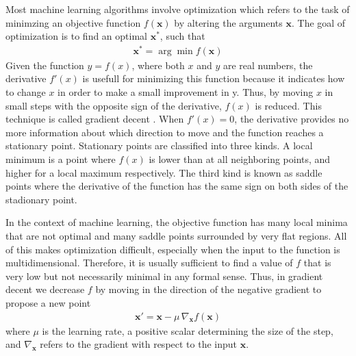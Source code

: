 \documentclass{scrartcl}
\begin{document}
Most machine learning algorithms involve optimization which refers to the task of minimzing an objective function $f(\mathbf x)$ by altering the arguments $\mathbf x$. The goal of optimization is to find an optimal $\mathbf x^*$, such that
\begin{align}
\mathbf x^* = \arg \min f(\mathbf x)
\end{align} 
Given the function $y=f(x)$, where both $x$ and $y$ are real numbers, the derivative $f'(x)$ is usefull for minimizing this function because it indicates how to change $x$ in order to make a small improvement in y. Thus, by moving $x$ in small steps with the opposite sign of the derivative, $f(x)$ is reduced. This technique is called gradient decent \cite{Cauchy1847}. When $f'(x)=0$, the derivative provides no more information about which direction to move and the function reaches a stationary point. Stationary points are classified into three kinds. A local minimum is a point where $f(x)$ is lower than at all neighboring points, and higher for a local maximum respectively. The third kind is known as saddle points where the derivative of the function has the same sign on both sides of the stadionary point.  

In the context of machine learning, the objective function has many local minima that are not optimal and many saddle points surrounded by very flat regions. All of this makes optimization difficult, especially when the input to the function is multidimensional. Therefore, it is usually sufficient to find  a value of $f$ that is very low but not necessarily minimal in any formal sense. Thus, in gradient decent we decrease $f$ by moving in the direction of the negative gradient to propose a new point
\begin{align}
\mathbf x' = \mathbf x - \mu \,\nabla_{\mathbf x}f(\mathbf x)
\end{align} 
where $\mu$ is the learning rate, a positive scalar determining the size of the step, and $\nabla_{\mathbf x}$ refers to the gradient with respect to the input $\mathbf x$.
\end{document}
